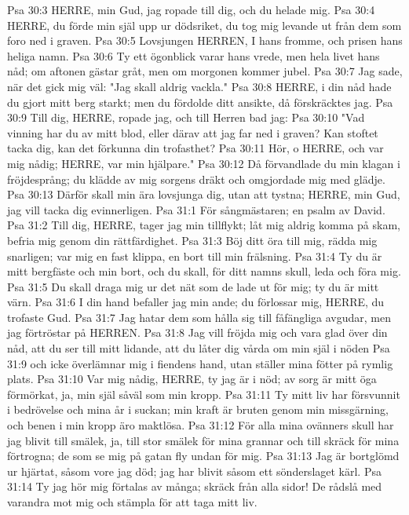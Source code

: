 Psa 30:3  HERRE, min Gud, jag ropade till dig, och du helade mig.
Psa 30:4  HERRE, du förde min själ upp ur dödsriket, du tog mig levande ut från dem som foro ned i graven.
Psa 30:5  Lovsjungen HERREN, I hans fromme, och prisen hans heliga namn.
Psa 30:6  Ty ett ögonblick varar hans vrede, men hela livet hans nåd; om aftonen gästar gråt, men om morgonen kommer jubel.
Psa 30:7  Jag sade, när det gick mig väl: "Jag skall aldrig vackla."
Psa 30:8  HERRE, i din nåd hade du gjort mitt berg starkt; men du fördolde ditt ansikte, då förskräcktes jag.
Psa 30:9  Till dig, HERRE, ropade jag, och till Herren bad jag:
Psa 30:10  "Vad vinning har du av mitt blod, eller därav att jag far ned i graven? Kan stoftet tacka dig, kan det förkunna din trofasthet?
Psa 30:11  Hör, o HERRE, och var mig nådig; HERRE, var min hjälpare."
Psa 30:12  Då förvandlade du min klagan i fröjdesprång; du klädde av mig sorgens dräkt och omgjordade mig med glädje.
Psa 30:13  Därför skall min ära lovsjunga dig, utan att tystna; HERRE, min Gud, jag vill tacka dig evinnerligen.
Psa 31:1  För sångmästaren; en psalm av David.
Psa 31:2  Till dig, HERRE, tager jag min tillflykt; låt mig aldrig komma på skam, befria mig genom din rättfärdighet.
Psa 31:3  Böj ditt öra till mig, rädda mig snarligen; var mig en fast klippa, en bort till min frälsning.
Psa 31:4  Ty du är mitt bergfäste och min bort, och du skall, för ditt namns skull, leda och föra mig.
Psa 31:5  Du skall draga mig ur det nät som de lade ut för mig; ty du är mitt värn.
Psa 31:6  I din hand befaller jag min ande; du förlossar mig, HERRE, du trofaste Gud.
Psa 31:7  Jag hatar dem som hålla sig till fåfängliga avgudar, men jag förtröstar på HERREN.
Psa 31:8  Jag vill fröjda mig och vara glad över din nåd, att du ser till mitt lidande, att du låter dig vårda om min själ i nöden
Psa 31:9  och icke överlämnar mig i fiendens hand, utan ställer mina fötter på rymlig plats.
Psa 31:10  Var mig nådig, HERRE, ty jag är i nöd; av sorg är mitt öga förmörkat, ja, min själ såväl som min kropp.
Psa 31:11  Ty mitt liv har försvunnit i bedrövelse och mina år i suckan; min kraft är bruten genom min missgärning, och benen i min kropp äro maktlösa.
Psa 31:12  För alla mina ovänners skull har jag blivit till smälek, ja, till stor smälek för mina grannar och till skräck för mina förtrogna; de som se mig på gatan fly undan för mig.
Psa 31:13  Jag är bortglömd ur hjärtat, såsom vore jag död; jag har blivit såsom ett sönderslaget kärl.
Psa 31:14  Ty jag hör mig förtalas av många; skräck från alla sidor! De rådslå med varandra mot mig och stämpla för att taga mitt liv.
